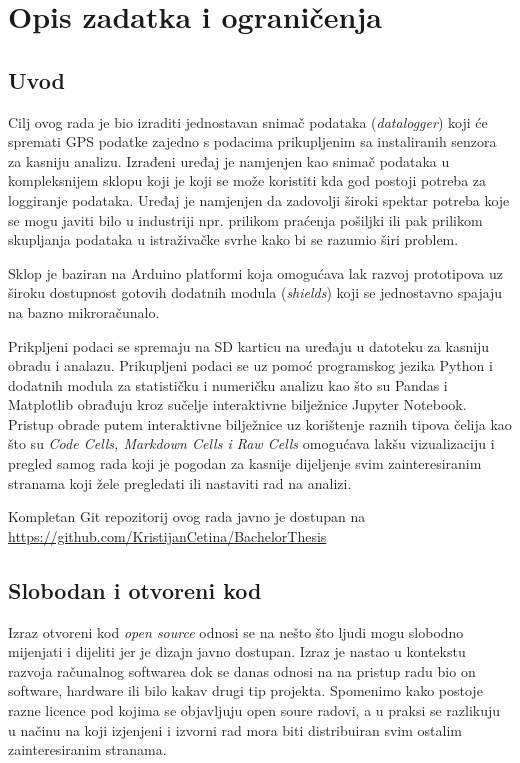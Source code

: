 \chapter{Opis zadatka i ograničenja}\label{OpisIOgranicenja}
\section{Uvod}
Cilj ovog rada je bio izraditi jednostavan snimač podataka (\textit{datalogger}) koji će spremati GPS podatke zajedno s podacima prikupljenim sa instaliranih senzora za kasniju analizu.
Izrađeni uređaj je namjenjen kao snimač podataka u kompleksnijem sklopu koji je koji se može koristiti kda god postoji potreba za loggiranje podataka.
Uređaj je namjenjen da zadovolji široki spektar potreba koje se mogu javiti bilo u industriji npr. prilikom praćenja pošiljki ili pak prilikom skupljanja podataka u istraživačke svrhe kako bi se razumio širi problem.

Sklop je baziran na Arduino platformi koja omogućava lak razvoj prototipova uz široku dostupnost gotovih dodatnih modula (\textit{shields}) koji se jednostavno spajaju na bazno mikroračunalo.

Prikpljeni podaci se spremaju na SD karticu na uređaju u datoteku za kasniju obradu i analazu.
Prikupljeni podaci se uz pomoć programskog jezika Python i dodatnih modula za statističku i numeričku analizu kao što su Pandas i Matplotlib obrađuju kroz sučelje interaktivne bilježnice Jupyter Notebook.
Pristup obrade putem interaktivne bilježnice uz korištenje raznih tipova čelija kao što su \textit{Code Cells, Markdown Cells i Raw Cells} omogućava lakšu vizualizaciju i pregled samog rada koji je pogodan za kasnije dijeljenje svim zainteresiranim stranama koji žele pregledati ili nastaviti rad na analizi.

Kompletan Git repozitorij ovog rada javno je dostupan na \url{https://github.com/KristijanCetina/BachelorThesis}

\section{Slobodan i otvoreni kod}
Izraz otvoreni kod \textit{open source} odnosi se na nešto što ljudi mogu slobodno mijenjati i dijeliti jer je dizajn javno dostupan\cite{WhatIsOpenSource}.
Izraz je nastao u kontekstu razvoja računalnog softwarea dok se danas odnosi na na pristup radu bio on software, hardware ili bilo kakav drugi tip projekta.
Spomenimo kako postoje razne licence pod kojima se objavljuju open soure radovi, a u praksi se razlikuju u načinu na koji izjenjeni i izvorni rad mora biti distribuiran svim ostalim zainteresiranim stranama.

